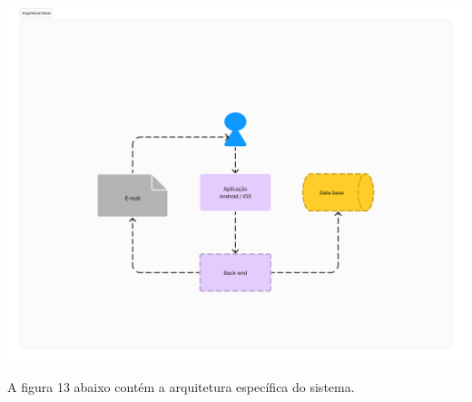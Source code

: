     \vspace{\baselineskip}
    \begin{center}
        \begin{minipage}{\textwidth}
            \centering
            \includegraphics[scale=0.17]{figs/arq_geral.png}
            \label{fig:arq-geral}
        \end{minipage}
    \end{center}

A figura 13 abaixo contém a arquitetura específica do sistema.

